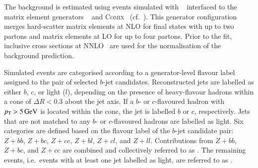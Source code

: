 %
%

The \Zjets background is estimated using events simulated with
\SHERPA[2.2.1]~\cite{Bothmann:2019yzt} interfaced to the matrix element
generators \OPENLOOPS~\cite{Buccioni:2019sur,Cascioli:2011va,Denner:2016kdg} and
\textsc{Comix}~\cite{Gleisberg:2008fv} (cf.\ ). This
generator configuration merges hard-scatter matrix elements at NLO for final
states with up to two partons and matrix elements at LO for up to four
partons. Prior to the fit, inclusive \Zjets cross sections at
NNLO~\cite{Anastasiou:2003ds} are used for the normalisation of the background
prediction.

Simulated \Zjets events are categorised according to a generator-level flavour
label assigned to the pair of selected $b$-jet candidates. Reconstructed jets
are labelled as either $b$, $c$, or light ($l$), depending on the presence of
heavy-flavour hadrons within a cone of $\Delta R < 0.3$ about the jet axis. If a
$b$- or $c$-flavoured hadron with $p_{\text{T}} > \SI{5}{\ensuremath{\text{GeV}}}$ is located within the
cone, the jet is labelled $b$ or $c$, respectively. Jets that are not matched to
any $b$- or $c$-flavoured hadrons are labelled as light.
Six categories are defined based on the flavour label of the $b$-jet candidate
pair:~$Z + bb$, $Z + bc$, $Z + cc$, $Z + bl$, $Z + cl$, and $Z +
ll$. Contributions from $Z + bb$, $Z + bc$, and $Z + cc$ are combined and
collectively referred to as \ZHF. The remaining \Zjets events, i.e.\ events with
at least one jet labelled as light, are referred to as \ZLF.

